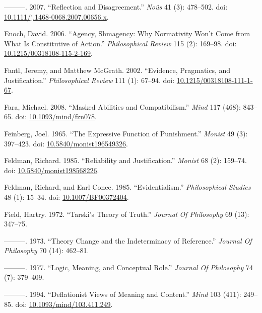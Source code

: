 \documentclass[
  10pt,
  letterpaper,
  DIV=11,
  numbers=noendperiod,
  twoside]{scrartcl}
\newlength{\cslhangindent}
\newenvironment{CSLReferences}[2] %
 {\begin{list}{}{%
  \setlength{\itemindent}{0pt}
  \setlength{\leftmargin}{0pt}
  \setlength{\parsep}{0pt}
  \ifodd #1
   \setlength{\leftmargin}{\cslhangindent}
   \setlength{\itemindent}{-1\cslhangindent}
  \fi
  \setlength{\itemsep}{#2\baselineskip}}}
 {\end{list}}
\begin{document}
\begin{CSLReferences}{1}{0}
---------. 2007. {``Reflection and Disagreement.''} \emph{Noûs} 41 (3):
478--502. doi:
\href{https://doi.org/10.1111/j.1468-0068.2007.00656.x}{10.1111/j.1468-0068.2007.00656.x}.

Enoch, David. 2006. {``Agency, Shmagency: Why Normativity Won't Come
from What Is Constitutive of Action.''} \emph{Philosophical Review} 115
(2): 169--98. doi:
\href{https://doi.org/10.1215/00318108-115-2-169}{10.1215/00318108-115-2-169}.

Fantl, Jeremy, and Matthew McGrath. 2002. {``Evidence, Pragmatics, and
Justification.''} \emph{Philosophical Review} 111 (1): 67--94. doi:
\href{https://doi.org/10.1215/00318108-111-1-67}{10.1215/00318108-111-1-67}.

Fara, Michael. 2008. {``Masked Abilities and Compatibilism.''}
\emph{Mind} 117 (468): 843--65. doi:
\href{https://doi.org/10.1093/mind/fzn078}{10.1093/mind/fzn078}.

Feinberg, Joel. 1965. {``The Expressive Function of Punishment.''}
\emph{Monist} 49 (3): 397--423. doi:
\href{https://doi.org/10.5840/monist196549326}{10.5840/monist196549326}.

Feldman, Richard. 1985. {``Reliability and Justification.''}
\emph{Monist} 68 (2): 159--74. doi:
\href{https://doi.org/10.5840/monist198568226}{10.5840/monist198568226}.

Feldman, Richard, and Earl Conee. 1985. {``Evidentialism.''}
\emph{Philosophical Studies} 48 (1): 15--34. doi:
\href{https://doi.org/10.1007/BF00372404}{10.1007/BF00372404}.

Field, Hartry. 1972. {``Tarski's Theory of Truth.''} \emph{Journal Of
Philosophy} 69 (13): 347--75.

---------. 1973. {``Theory Change and the Indeterminacy of Reference.''}
\emph{Journal Of Philosophy} 70 (14): 462--81.

---------. 1977. {``Logic, Meaning, and Conceptual Role.''}
\emph{Journal Of Philosophy} 74 (7): 379--409.

---------. 1994. {``Deflationist Views of Meaning and Content.''}
\emph{Mind} 103 (411): 249--85. doi:
\href{https://doi.org/10.1093/mind/103.411.249}{10.1093/mind/103.411.249}.


\end{CSLReferences}
\end{document}
